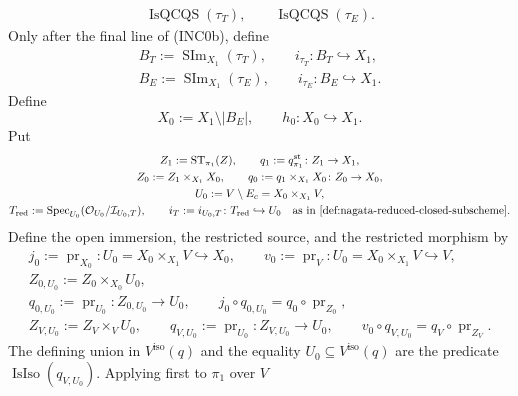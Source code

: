 \begin{definition}
\[\begin{gathered}
    \operatorname{IsQCQS}(\tau_T),\qquad
    \operatorname{IsQCQS}(\tau_E).
  \end{gathered}                                                    \tag{INC0b}
  \]
  Only after the final line of (INC0b), define
  \[
  \begin{gathered}
    B_T:=\operatorname{SIm}_{X_1}(\tau_T),\qquad
    i_{\tau_T}\colon B_T\hookrightarrow X_1,\\
    B_E:=\operatorname{SIm}_{X_1}(\tau_E),\qquad
    i_{\tau_E}\colon B_E\hookrightarrow X_1.
  \end{gathered}                                                    \tag{INC0c}
  \]
  Define
  \[
    X_0:=X_1\setminus|B_E|,\qquad h_0\colon X_0\hookrightarrow X_1.
  \]
  Put
  \[
  \begin{gathered}
    Z_1:=\operatorname{ST}_{\pi_1}(Z),\qquad
    q_1:=q^{\mathrm{st}}_{\pi_1}\colon Z_1\to X_1,\\
    Z_0:=Z_1\times_{X_1}X_0,\qquad
    q_0:=q_1\times_{X_1}X_0\colon Z_0\to X_0,\\
    U_0:=V\setminus E_c=X_0\times_{X_1}V,\\
    T_{\mathrm{red}}
      :=\operatorname{Spec}_{U_0}
        (\mathcal O_{U_0}/\mathcal I_{U_0,T}),\qquad
    i_T:=i_{U_0,T}\colon T_{\mathrm{red}}\hookrightarrow U_0
      \quad\text{as in
        \Cref{def:nagata-reduced-closed-subscheme}}.
  \end{gathered}
  \]
  Define the open immersion, the restricted source, and the restricted morphism
  by
  \[
  \begin{gathered}
    j_0:=\operatorname{pr}_{X_0}\colon
      U_0=X_0\times_{X_1}V\hookrightarrow X_0,\qquad
    v_0:=\operatorname{pr}_V\colon
      U_0=X_0\times_{X_1}V\hookrightarrow V,\\
    Z_{0,U_0}:=Z_0\times_{X_0}U_0,\\
    q_{0,U_0}:=\operatorname{pr}_{U_0}
      \colon Z_{0,U_0}\longrightarrow U_0,\qquad
    j_0\circ q_{0,U_0}=q_0\circ\operatorname{pr}_{Z_0},\\
    Z_{V,U_0}:=Z_V\times_VU_0,\qquad
    q_{V,U_0}:=\operatorname{pr}_{U_0}
      \colon Z_{V,U_0}\longrightarrow U_0,\qquad
    v_0\circ q_{V,U_0}=q_V\circ\operatorname{pr}_{Z_V}.
  \end{gathered}                                                    \tag{INC0}
  \]
  The defining union in $V^{\mathrm{iso}}(q)$ and the equality
  $U_0\subseteq V^{\mathrm{iso}}(q)$ are the predicate
  $\operatorname{IsIso}(q_{V,U_0})$.  Applying
   first to $\pi_1$ over $V$

\end{definition}
